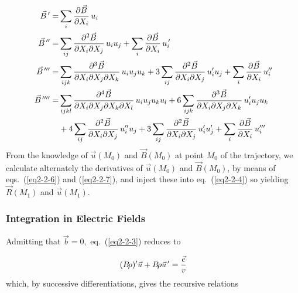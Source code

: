  \begin{equation}
	 \begin{aligned}
		 \vec  B^{\,\prime} =
		        &   \sum_i  \dfrac{\partial\vec  B}{\partial X_i}\, u_i \\
		 \vec  B^{\,\prime\prime} =
		        &  \sum_{ij}\dfrac{\partial^2\vec  B}{\partial X_i\partial X_j} 
		        \, u_i u_j+ \sum_i \dfrac{\partial\vec  B}{\partial X_i} \,u^{\,\prime}_i\\
		\vec  B^{\,\prime\prime\prime}  =
		        &  \sum_{ijk} \dfrac{\partial^3\vec  B}{\partial X_i\partial X_j\partial X_k}
		           \, u_i u_j u_k 
		           + 3 \sum_{ij} \dfrac{\partial^ 2\vec  B}{\partial X_i\partial X_j} \,u^{\prime}_i
		           u_j 
		           + \sum_i\dfrac{\partial\vec  B}{\partial X_i} \, u^{\prime\prime}_i \\
		\vec B^{\,\prime\prime\prime\prime}  = 
		        & \sum_{ijkl} \dfrac{\partial^ 4\vec  B}{\partial X_i\partial X_j\partial
		           X_k\partial X_l} \,u_i u_j u_k u_l 
		           + 6 \sum_{ijk}  \dfrac{\partial^ 3\vec  B}{\partial X_i\partial X_j\partial X_k} \,
		           u^{\prime}_i u_j u_k \\
		        &
		        +  4 \sum_{ij} \dfrac{\partial^ 2\vec  B}{\partial X_i\partial X_j}\,
		         u^{\prime\prime}_i u_j
		         + 3 \sum_{ij} \dfrac{\partial^ 2\vec  B}{\partial X_i\partial X_j}\,
		         u^{\prime}_i u^{\prime}_j 
		         + \sum_i \dfrac{\partial\vec  B}{\partial X_i}\, u^{\prime\prime \prime}_i 
	 \end{aligned}
 	\label{eq2-2-7}
 \end{equation} 
 \noindent From the knowledge of $ \vec  u(M_0) $ and $ \vec  B(M_0) $ at point
$ M_0 $ of the 
trajectory, we calculate alternately the derivatives of $ \vec  u(M_0) $ and 
$ \vec  B(M_0) $, by means of eqs.~(\ref{eq2-2-6}) and (\ref{eq2-2-7}), and inject these into eq.~(\ref{eq2-2-4}) 
 so yielding $ \vec  R(M_1) $ and $ \vec  u(M_1) $.


\subsubsection[Integration in Electric Fields]%
       {Integration in Electric Fields~\protect\cite{Biblio6}}
        \label{sec2.2.2} %

Admitting that $ \vec  b=0, $ eq.~(\ref{eq2-2-3}) reduces to 

\begin{equation}
	(B\!\rho )^\prime\vec  u + B\!\rho\vec  u^{\,\prime} = \dfrac{\vec  e}{ v}
	\label{eq2-2-8}
\end{equation} 
%
which, by successive differentiations, gives the recursive relations

